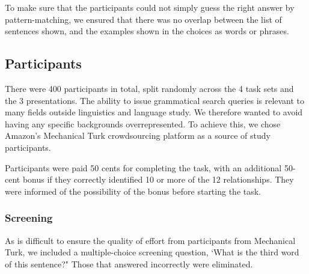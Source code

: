 To make sure that the participants could not simply guess the right answer by pattern-matching, we ensured that there was no overlap between the list of sentences shown, and the examples shown in the choices as words or phrases.


\subsection{Participants}
There were 400 participants in total, split randomly across the 4 task sets and the 3 presentations. The ability to issue grammatical search queries is relevant to many fields outside linguistics and language study. We therefore wanted to avoid having any specific backgrounds overrepresented. To achieve this, we chose Amazon's Mechanical Turk crowdsourcing platform as a source of study participants.

Participants were paid 50 cents for completing the task, with an additional 50-cent bonus if they correctly identified 10 or more of the 12 relationships. They were informed of the possibility of the bonus before starting the task.

\subsubsection{Screening}

As is difficult to ensure the quality of effort from participants from Mechanical Turk, we included a multiple-choice screening question, `What is the third word of this sentence?"  Those that answered incorrectly were eliminated.


